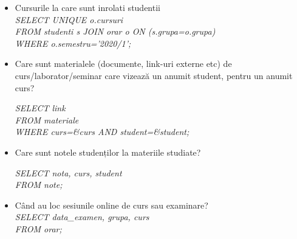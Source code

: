 \documentclass[a4paper,12pt]{article}
\begin{document}
		\begin{itemize}
			\item Cursurile la care sunt inrolati studentii\\
			\textit{
			SELECT UNIQUE o.cursuri\\
			FROM studenti s JOIN orar o ON (s.grupa=o.grupa)\\
			WHERE o.semestru='2020/1';}
			
			\item Care sunt materialele (documente, link-uri externe etc) de curs/laborator/seminar care vizează un anumit student, pentru un anumit curs?
			
			\textit{SELECT link\\
				FROM materiale\\
				WHERE curs=\&curs AND student=\&student;}
			\item 
			Care sunt notele studenților la materiile studiate?
			
			\textit{SELECT nota, curs, student\\
			FROM note;}
			\item Când au loc sesiunile online de curs sau examinare? \\
			\textit{
			SELECT data\_examen, grupa, curs\\
			FROM orar;}
				
		\end{itemize}
		
	
	
\end{document}
